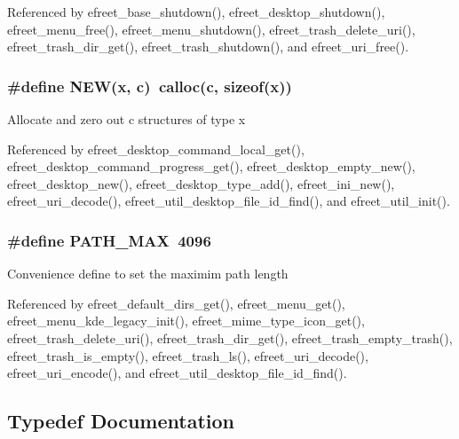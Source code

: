 Referenced by efreet\_\-base\_\-shutdown(), efreet\_\-desktop\_\-shutdown(), efreet\_\-menu\_\-free(), efreet\_\-menu\_\-shutdown(), efreet\_\-trash\_\-delete\_\-uri(), efreet\_\-trash\_\-dir\_\-get(), efreet\_\-trash\_\-shutdown(), and efreet\_\-uri\_\-free().
\subsubsection{\setlength{\rightskip}{0pt plus 5cm}\#define NEW(x, \/  c)~calloc(c, sizeof(x))}\label{group__Efreet__Private_g1bf6c092db09b704eec6aa39b578ca6a}


Allocate and zero out c structures of type x 

Referenced by efreet\_\-desktop\_\-command\_\-local\_\-get(), efreet\_\-desktop\_\-command\_\-progress\_\-get(), efreet\_\-desktop\_\-empty\_\-new(), efreet\_\-desktop\_\-new(), efreet\_\-desktop\_\-type\_\-add(), efreet\_\-ini\_\-new(), efreet\_\-uri\_\-decode(), efreet\_\-util\_\-desktop\_\-file\_\-id\_\-find(), and efreet\_\-util\_\-init().
\subsubsection{\setlength{\rightskip}{0pt plus 5cm}\#define PATH\_\-MAX~4096}\label{group__Efreet__Private_ge688d728e1acdfe5988c7db45d6f0166}


Convenience define to set the maximim path length 

Referenced by efreet\_\-default\_\-dirs\_\-get(), efreet\_\-menu\_\-get(), efreet\_\-menu\_\-kde\_\-legacy\_\-init(), efreet\_\-mime\_\-type\_\-icon\_\-get(), efreet\_\-trash\_\-delete\_\-uri(), efreet\_\-trash\_\-dir\_\-get(), efreet\_\-trash\_\-empty\_\-trash(), efreet\_\-trash\_\-is\_\-empty(), efreet\_\-trash\_\-ls(), efreet\_\-uri\_\-decode(), efreet\_\-uri\_\-encode(), and efreet\_\-util\_\-desktop\_\-file\_\-id\_\-find().

\subsection{Typedef Documentation}
